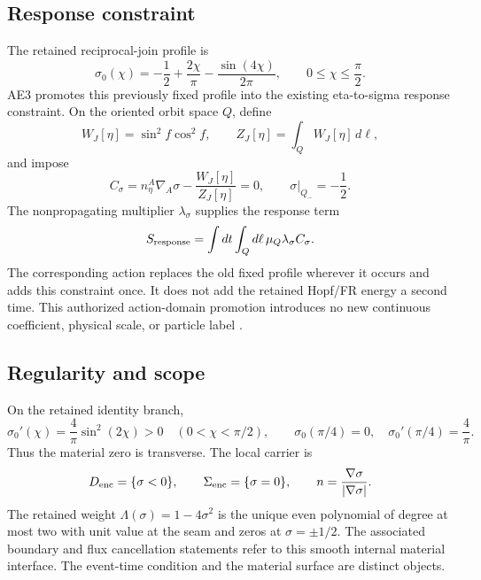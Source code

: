 \documentclass[11pt]{article}
\begin{document}
\subsection{Response constraint}
The retained reciprocal-join profile is
\begin{equation}
 \sigma_0(\chi)=-\frac12+\frac{2\chi}{\pi}
                    -\frac{\sin(4\chi)}{2\pi},
 \qquad 0\leq\chi\leq\frac\pi2.
\end{equation}
AE3 promotes this previously fixed profile into the existing eta-to-sigma
response constraint. On the oriented orbit space \(Q\), define
\begin{equation}
 W_J[\eta]=\sin^2f\cos^2f,\qquad
 Z_J[\eta]=\int_Q W_J[\eta]\,d\ell,
\end{equation}
and impose
\begin{equation}
 C_\sigma=n_\eta^A\nabla_A\sigma-\frac{W_J[\eta]}{Z_J[\eta]}=0,
 \qquad \sigma|_{Q_-}=-\frac12.
\end{equation}
The nonpropagating multiplier \(\lambda_\sigma\) supplies the response term
\begin{equation}
 S_{\rm response}=\int dt\int_Q d\ell\,\mu_Q\lambda_\sigma C_\sigma.
\end{equation}
The corresponding action replaces the old fixed profile wherever it occurs
and adds this constraint once. It does not add the retained Hopf/FR energy a
second time. This authorized action-domain promotion introduces no new
continuous coefficient, physical scale, or particle label \cite{ae3}.

\subsection{Regularity and scope}
On the retained identity branch,
\begin{equation}
 \sigma_0'(\chi)=\frac4\pi\sin^2(2\chi)>0
 \quad(0<\chi<\pi/2),\qquad
 \sigma_0(\pi/4)=0,\quad \sigma_0'(\pi/4)=\frac4\pi.
\end{equation}
Thus the material zero is transverse. The local carrier is
\begin{equation}
 D_{\rm enc}=\{\sigma<0\},\qquad
 \Sigma_{\rm enc}=\{\sigma=0\},\qquad
 n=\frac{\nabla\sigma}{|\nabla\sigma|}.
\end{equation}
The retained weight \(\Lambda(\sigma)=1-4\sigma^2\) is the unique even
polynomial of degree at most two with unit value at the seam and zeros at
\(\sigma=\pm1/2\). The associated boundary and flux cancellation statements
refer to this smooth internal material interface. The event-time condition
and the material surface are distinct objects.
\end{document}
